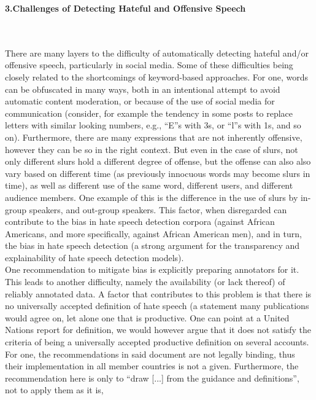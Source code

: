 \documentclass{letter}
\begin{document}
\newpage
\begin{multicols}{2}
\begin{large}{\textbf{3.Challenges of Detecting Hateful and Offensive
Speech}}\end{large} \\ \\ 
There are many layers to the difficulty of automatically 
detecting hateful and/or offensive speech, particularly 
in social media. Some of these difficulties being closely 
related to the shortcomings of keyword-based 
approaches. For one, words can be obfuscated in many 
ways, both in an intentional attempt to avoid automatic 
content moderation, or because of the use of social 
media for communication (consider, for example the 
tendency in some posts to replace letters with similar 
looking numbers, e.g., “E”s with 3s, or “l”s with 1s, and 
so on). Furthermore, there are many expressions that 
are not inherently offensive, however they can be so in 
the right context. But even in the case of slurs, not only 
different slurs hold a different degree of offense, but the 
offense can also also vary based on different time (as 
previously innocuous words may become slurs in time), 
as well as different use of the same word, different 
users, and different audience members. One example of 
this is the difference in the use of slurs by in-group 
speakers, and out-group speakers. This factor, when 
disregarded can contribute to the bias in hate speech 
detection corpora (against African
Americans, and more specifically, against African 
American men), and in turn, the bias in hate speech 
detection (a strong argument for the transparency and 
explainability of hate speech detection models). \\ 
One recommendation to mitigate bias is explicitly 
preparing annotators for it. This leads to another 
difficulty, namely the availability (or lack thereof) of 
reliably annotated data. A factor that contributes to this 
problem is that there is no universally accepted 
definition of hate speech (a statement many 
publications would agree on, let alone one that is 
productive. One can point at a United Nations report for 
definition, we would however argue that it does not 
satisfy the criteria of being a universally accepted 
productive definition on several accounts. For one, the 
recommendations in said document are not legally 
binding, thus their implementation in all member 
countries is not a given. Furthermore, the 
recommendation here is only to “draw [...] from the 
guidance and definitions”, not to apply them as it is, 

\end{multicols}
\end{document}
